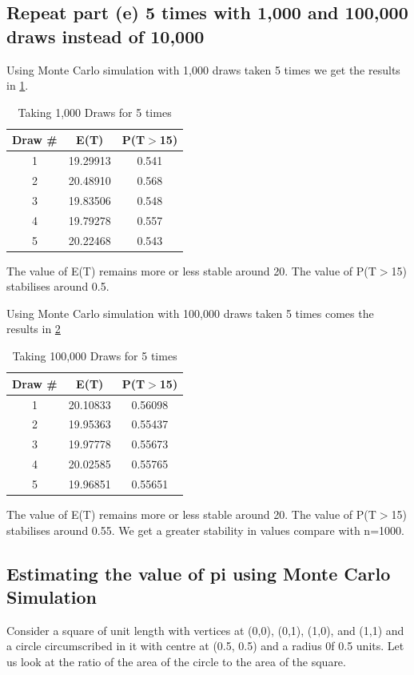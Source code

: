 \documentclass[12pt,letterpaper,titlepage,en-US]{article}
\begin{document}
\subsection{Repeat part (e) 5 times with 1,000 and 100,000 draws instead of 10,000 }
Using Monte Carlo simulation with 1,000 draws taken 5 times we get the results in \cref{2}.
\begin{table}[H]
\centering
\begin{tabular}{|c|c|c|}
\hline
Draw \#    &E(T)    & P(T$>$15) \\\hline
1 &19.29913   &0.541\\\hline
2 &20.48910   &0.568\\\hline
3 &19.83506   &0.548\\\hline
4 &19.79278   &0.557\\\hline
5&20.22468   &0.543 \\\hline
\end{tabular}
\caption{Taking 1,000 Draws for 5 times}\label{2}
\end{table}
The value of E(T) remains more or less stable around 20. The value of P(T$>$15) stabilises around 0.5.

Using Monte Carlo simulation with 100,000 draws taken 5 times comes the results in \cref{3}
\begin{table}[H]
\centering
\begin{tabular}{|c|c|c|}
\hline
Draw \#    &E(T)    & P(T$>$15) \\\hline
1 &20.10833 &0.56098\\\hline
2& 19.95363 &0.55437\\\hline
3& 19.97778 &0.55673\\\hline
4& 20.02585 &0.55765\\\hline
5& 19.96851 &0.55651\\\hline

\end{tabular}
\caption{Taking 100,000 Draws for 5 times}\label{3}
\end{table}
The value of E(T) remains more or less stable around 20. The value of P(T$>$15) stabilises around 0.55. We get a greater stability in values compare with n=1000.



\subsection{Estimating the value of pi using Monte Carlo Simulation}
Consider a square of unit length with vertices at (0,0), (0,1), (1,0), and (1,1) and a circle circumscribed in it with centre at (0.5, 0.5) and a radius 0f 0.5 units. 
Let us look at the ratio of the area of the circle to the area of the square.
\end{document}
